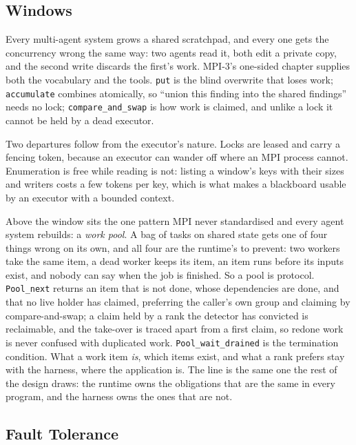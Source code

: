 \documentclass[sigconf,nonacm]{acmart}
\newcommand{\code}[1]{\texttt{\small #1}}
\begin{document}
\subsection{Windows}
\label{sec:win}

Every multi-agent system grows a shared scratchpad, and every one gets the
concurrency wrong the same way: two agents read it, both edit a private copy, and
the second write discards the first's work. MPI-3's one-sided chapter supplies
both the vocabulary and the tools. \code{put} is the blind overwrite that loses
work; \code{accumulate} combines atomically, so ``union this finding into the
shared findings'' needs no lock; \code{compare\_and\_swap} is how work is
claimed, and unlike a lock it cannot be held by a dead executor.

Two departures follow from the executor's nature. Locks are leased and carry a
fencing token, because an executor can wander off where an MPI process cannot.
Enumeration is free while reading is not: listing a window's keys with their
sizes and writers costs a few tokens per key, which is what makes a blackboard
usable by an executor with a bounded context.

Above the window sits the one pattern MPI never standardised and every agent
system rebuilds: a \emph{work pool}. A bag of tasks on shared state gets one of
four things wrong on its own, and all four are the runtime's to prevent: two
workers take the same item, a dead worker keeps its item, an item runs before its
inputs exist, and nobody can say when the job is finished. So a pool is protocol.
\code{Pool\_next} returns an item that is not done, whose dependencies are done,
and that no live holder has claimed, preferring the caller's own group and
claiming by compare-and-swap; a claim held by a rank the detector has convicted is
reclaimable, and the take-over is traced apart from a first claim, so redone work
is never confused with duplicated work. \code{Pool\_wait\_drained} is the
termination condition. What a work item \emph{is}, which items exist, and what a
rank prefers stay with the harness, where the application is. The line is the same
one the rest of the design draws: the runtime owns the obligations that are the
same in every program, and the harness owns the ones that are not.

\subsection{Fault Tolerance}
\label{sec:ft}
\end{document}

